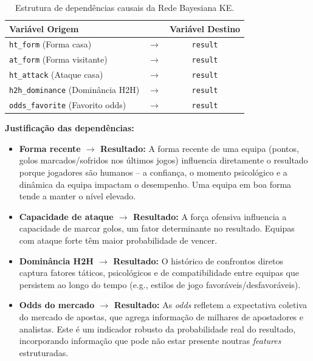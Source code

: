 \documentclass[12pt, a4paper]{article}
\begin{document}
\begin{table}[H]
  \centering
  \caption{Estrutura de dependências causais da Rede Bayesiana KE.}
  \begin{tabular}{lcc}
    \toprule
    \textbf{Variável Origem} & & \textbf{Variável Destino} \\
    \midrule
    \texttt{ht\_form} (Forma casa) & $\rightarrow$ & \texttt{result} \\
    \texttt{at\_form} (Forma visitante) & $\rightarrow$ & \texttt{result} \\
    \texttt{ht\_attack} (Ataque casa) & $\rightarrow$ & \texttt{result} \\
    \texttt{h2h\_dominance} (Dominância H2H) & $\rightarrow$ & \texttt{result} \\
    \texttt{odds\_favorite} (Favorito odds) & $\rightarrow$ & \texttt{result} \\
    \bottomrule
  \end{tabular}
  \label{tab:ke_edges}
\end{table}

\textbf{Justificação das dependências:}

\begin{itemize}
  \item \textbf{Forma recente $\rightarrow$ Resultado:} A forma recente de uma equipa (pontos, golos marcados/sofridos nos últimos jogos) influencia diretamente o resultado porque jogadores são humanos -- a confiança, o momento psicológico e a dinâmica da equipa impactam o desempenho. Uma equipa em boa forma tende a manter o nível elevado.

  \item \textbf{Capacidade de ataque $\rightarrow$ Resultado:} A força ofensiva influencia a capacidade de marcar golos, um fator determinante no resultado. Equipas com ataque forte têm maior probabilidade de vencer.

  \item \textbf{Dominância H2H $\rightarrow$ Resultado:} O histórico de confrontos diretos captura fatores táticos, psicológicos e de compatibilidade entre equipas que persistem ao longo do tempo (e.g., estilos de jogo favoráveis/desfavoráveis).

  \item \textbf{Odds do mercado $\rightarrow$ Resultado:} As \textit{odds} refletem a expectativa coletiva do mercado de apostas, que agrega informação de milhares de apostadores e analistas. Este é um indicador robusto da probabilidade real do resultado, incorporando informação que pode não estar presente noutras \textit{features} estruturadas.
\end{itemize}
\end{document}
